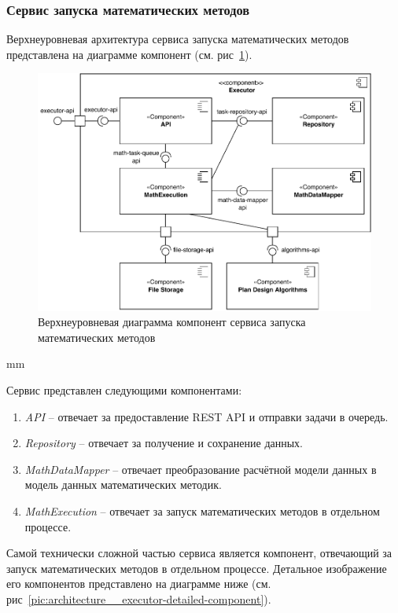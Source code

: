 \subsubsection{\large{Сервис запуска математических методов}}

Верхнеуровневая архитектура сервиса запуска математических методов представлена на диаграмме компонент
(см. рис\ \ref{pic:architecture__executor-component}).

\begin{figure}[H]
	\includegraphics[width=\textwidth]{architecture/pictures/executor/component_common}
	\caption{Верхнеуровневая диаграмма компонент сервиса запуска математических методов}
	\label{pic:architecture__executor-component}
\end{figure}
 mm

Сервис представлен следующими компонентами:
\begin{enumerate}
	\item {
		\textit{API} -- отвечает за предоставление REST API и отправки задачи в очередь.
	}
	\item {
		\textit{Repository} -- отвечает за получение и сохранение данных.
	}
	\item {
		\textit{MathDataMapper} -- отвечает преобразование расчётной модели данных в модель данных математических методик.
	}
	\item {
		\textit{MathExecution} -- отвечает за запуск математических методов в отдельном процессе.
	}
\end{enumerate}

Самой технически сложной частью сервиса является компонент, отвечающий за запуск математических методов
в отдельном процессе. Детальное изображение его компонентов представлено
на диаграмме ниже (см. рис\ \ref{pic:architecture__executor-detailed-component}).

